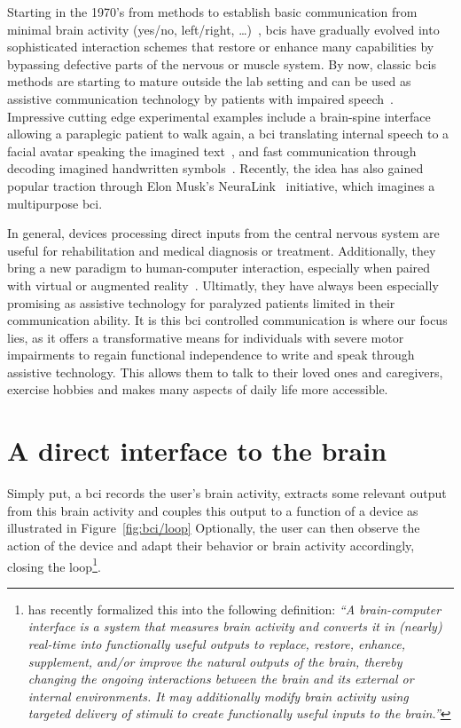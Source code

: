 Starting in the 1970's from methods to establish basic communication from
minimal brain activity (yes/no, left/right, \ldots)~\cite{Wolpaw2002}, \acp{bci} have gradually evolved
into sophisticated interaction schemes that restore or enhance many capabilities
by bypassing defective parts of the nervous or muscle system.
By now, classic \acp{bci} methods are starting to mature outside the lab
setting and can be used as assistive communication technology by patients with
impaired speech~\cite{Wolpaw2018,Milekovic2018}.
Impressive cutting edge experimental examples include a brain-spine
interface allowing a paraplegic patient to walk again\cite{Lorach2023},
a \ac{bci} translating internal speech to a facial avatar speaking the imagined
text~\cite{Metzger2023}, and fast communication through decoding imagined
handwritten symbols~\cite{Willett2021}.
Recently, the idea has also gained popular traction through Elon Musk's
NeuraLink~\cite{Musk2019} initiative, which imagines a multipurpose \ac{bci}.

In general, devices processing direct inputs from the central nervous system
are useful for rehabilitation and medical diagnosis or treatment.
Additionally, they bring a new paradigm to human-computer interaction,
especially when paired with virtual or augmented reality~\cite{SiMohammed2017}.
Ultimatly, they have always been especially promising as assistive technology for
paralyzed patients limited in their communication ability.
It is this \ac{bci} controlled communication is where our focus lies,
as it offers a transformative means for individuals with severe motor
impairments to regain functional independence to write and speak through
assistive technology.
This allows them to talk to their loved ones and caregivers, exercise hobbies
and makes many aspects of daily life more accessible.


\section{A direct interface to the brain}

Simply put, a \ac{bci} records the user's brain activity, extracts some
relevant output from this brain activity and couples this output to a function
of a device as illustrated in Figure~\ref{fig:bci/loop}
Optionally, the user can then observe the action of the device and adapt their
behavior or brain activity accordingly, closing the loop\footnote{%
  \textcite{BCISociety2024} has recently formalized this into the
  following definition:
  \it``A brain-computer interface is a system that measures brain activity and
  converts it in (nearly) real-time into functionally useful outputs to replace,
  restore, enhance, supplement, and/or improve the natural outputs of the brain,
  thereby changing the ongoing interactions between the brain and its external or
  internal environments. It may additionally modify brain activity using targeted
  delivery of stimuli to create functionally useful inputs to the
  brain.''
}.

